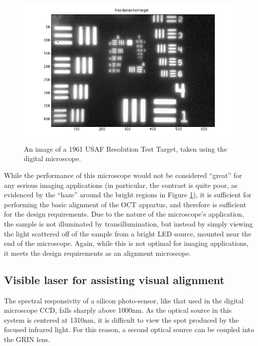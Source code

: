 \begin{figure}[h!]

\centering
\includegraphics[width=1.0\textwidth]{Images/Microscope/target.png}
\caption{An image of a 1961 USAF Resolution Test Target, taken using the digital microscope. \label{fig:usaf}}
\end{figure}

While the performance of this microscope would not be considered ``great'' for any serious imaging applications (in particular, the contrast is quite poor, as evidenced by the ``haze'' around the bright regions in Figure \ref{fig:usaf}), it is sufficient for performing the basic alignment of the OCT appartus, and therefore is sufficient for the design requirements. Due to the nature of the microscope's application, the sample is not illuminated by transillumination, but instead by simply viewing the light scattered off of the sample from a bright LED source, mounted near the end of the microscope. Again, while this is not optimal for imaging applications, it meets the design requirements as an alignment microscope.

\subsection{Visible laser for assisting visual alignment}


The spectral responsivity of a silicon photo-sensor, like that used in the digital microscope CCD, falls sharply above 1000nm. As the optical source in this system is centered at 1310nm, it is difficult to view the spot produced by the focused infrared light. For this reason, a second optical source can be coupled into the GRIN lens.

